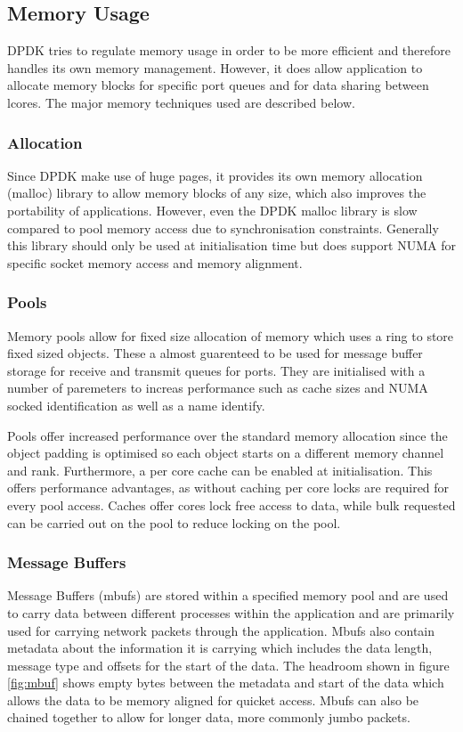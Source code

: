 \documentclass[final_report.tex]{subfiles}
\begin{document}
\subsection{Memory Usage}
DPDK tries to regulate memory usage in order to be more efficient and therefore handles its own memory management. However, it does allow application to allocate memory blocks for specific port queues and for data sharing between lcores. The major memory techniques used are described below.


\subsubsection{Allocation}
Since DPDK make use of huge pages, it provides its own memory allocation (malloc) library to allow memory blocks of any size, which also improves the portability of applications. However, even the DPDK malloc library is slow compared to pool memory access due to synchronisation constraints. Generally this library should only be used at initialisation time but does support NUMA for specific socket memory access and memory alignment.

\subsubsection{Pools}
Memory pools allow for fixed size allocation of memory which uses a ring to store fixed sized objects. These a almost guarenteed to be used for message buffer storage for receive and transmit queues for ports. They are initialised with a number of paremeters to increas performance such as cache sizes and NUMA socked identification as well as a name identify.

Pools offer increased performance over the standard memory allocation since the object padding is optimised so each object starts on a different memory channel and rank. Furthermore, a per core cache can be enabled at initialisation. This offers performance advantages, as without caching per core locks are required for every pool access. Caches offer cores lock free access to data, while bulk requested can be carried out on the pool to reduce locking on the pool.

\subsubsection{Message Buffers}
Message Buffers (mbufs) are stored within a specified memory pool and are used to carry data between different processes within the application and are primarily used for carrying network packets through the application. Mbufs also contain metadata about the information it is carrying which includes the data length, message type and offsets for the start of the data. The headroom shown in figure \ref{fig:mbuf} shows empty bytes between the metadata and start of the data which allows the data to be memory aligned for quicket access. Mbufs can also be chained together to allow for longer data, more commonly jumbo packets.
\end{document}
